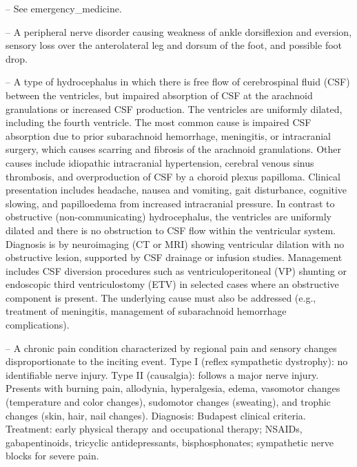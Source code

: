 -- See emergency\_medicine.

-- A peripheral nerve disorder causing weakness of ankle dorsiflexion and eversion, sensory loss over the anterolateral leg and dorsum of the foot, and possible foot drop.

-- A type of hydrocephalus in which there is free flow of cerebrospinal fluid (CSF) between the ventricles, but impaired absorption of CSF at the arachnoid granulations or increased CSF production. The ventricles are uniformly dilated, including the fourth ventricle. The most common cause is impaired CSF absorption due to prior subarachnoid hemorrhage, meningitis, or intracranial surgery, which causes scarring and fibrosis of the arachnoid granulations. Other causes include idiopathic intracranial hypertension, cerebral venous sinus thrombosis, and overproduction of CSF by a choroid plexus papilloma. Clinical presentation includes headache, nausea and vomiting, gait disturbance, cognitive slowing, and papilloedema from increased intracranial pressure. In contrast to obstructive (non-communicating) hydrocephalus, the ventricles are uniformly dilated and there is no obstruction to CSF flow within the ventricular system. Diagnosis is by neuroimaging (CT or MRI) showing ventricular dilation with no obstructive lesion, supported by CSF drainage or infusion studies. Management includes CSF diversion procedures such as ventriculoperitoneal (VP) shunting or endoscopic third ventriculostomy (ETV) in selected cases where an obstructive component is present. The underlying cause must also be addressed (e.g., treatment of meningitis, management of subarachnoid hemorrhage complications).

-- A chronic pain condition characterized by regional pain and sensory changes disproportionate to the inciting event. Type I (reflex sympathetic dystrophy): no identifiable nerve injury. Type II (causalgia): follows a major nerve injury. Presents with burning pain, allodynia, hyperalgesia, edema, vasomotor changes (temperature and color changes), sudomotor changes (sweating), and trophic changes (skin, hair, nail changes). Diagnosis: Budapest clinical criteria. Treatment: early physical therapy and occupational therapy; NSAIDs, gabapentinoids, tricyclic antidepressants, bisphosphonates; sympathetic nerve blocks for severe pain.

